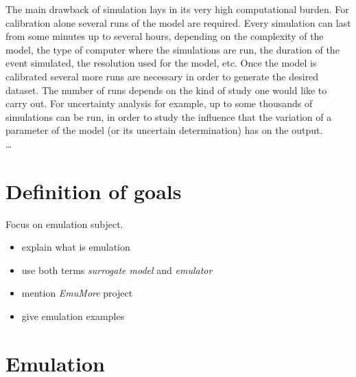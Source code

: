 The main drawback of simulation lays in its very high computational burden.
For calibration alone several runs of the model are required.
Every simulation can last from some minutes up to several hours, depending on the complexity of the model, the type of computer where the simulations are run, the duration of the event simulated, the resolution used for the model, etc.
Once the model is calibrated several more runs are necessary in order to generate the desired dataset.
The number of runs depends on the kind of study one would like to carry out.
For uncertainty analysis for example, up to some thousands of simulations can be run, in order to study the influence that the variation of a parameter of the model (or its uncertain determination) has on the output.\\

\ldots\\




\section{Definition of goals}

Focus on emulation subject.

\begin{itemize}
\itemsep0em
  \item explain what is emulation
  \item use both terms \textit{surrogate model} and \textit{emulator}
  \item mention \textit{EmuMore} project
  \item give emulation examples
\end{itemize}


\section{Emulation}

